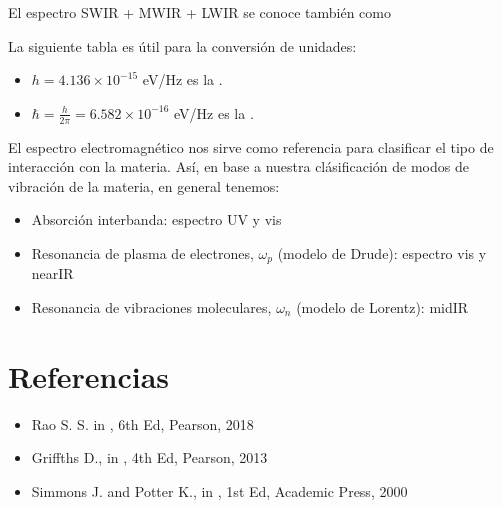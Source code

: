 \documentclass[letterpaper,10pt,english]{jupyterBook}
\let\sphinxpxdimen\pdfpxdimen\else\newdimen\sphinxpxdimen
\begin{document}
\sphinxAtStartPar
El espectro SWIR + MWIR + LWIR se conoce también como 

\sphinxAtStartPar
La siguiente tabla es útil para la conversión de unidades:

\noindent{\hspace*{\fill}\sphinxincludegraphics[width=600\sphinxpxdimen]{{conversion_table}.png}\hspace*{\fill}}
\begin{itemize}
\item {} 
\sphinxAtStartPar
\(h = 4.136\times 10^{−15}\) eV/Hz es la .

\item {} 
\sphinxAtStartPar
\(\hbar = \frac{h}{2\pi} = 6.582\times10^{−16}\) eV/Hz es la .

\end{itemize}

\sphinxAtStartPar
El espectro electromagnético nos sirve como referencia para clasificar el tipo de interacción con la materia. Así, en base a nuestra clásificación de modos de vibración de la materia, en general tenemos:
\begin{itemize}
\item {} 
\sphinxAtStartPar
Absorción interbanda: espectro UV y vis

\item {} 
\sphinxAtStartPar
Resonancia de plasma de electrones, \(\omega_p\) (modelo de Drude): espectro vis y near\sphinxhyphen{}IR

\item {} 
\sphinxAtStartPar
Resonancia de vibraciones moleculares, \(\omega_n\) (modelo de Lorentz): mid\sphinxhyphen{}IR

\end{itemize}


\section{Referencias}
\label{\detokenize{3_Interacci_xf3n_materia-luz/3_Interacci_xf3n_materia-luz:referencias}}\begin{itemize}
\item {} 
\sphinxAtStartPar
Rao S. S.  in , 6th Ed, Pearson, 2018

\item {} 
\sphinxAtStartPar
Griffths D.,  in , 4th Ed, Pearson, 2013

\item {} 
\sphinxAtStartPar
Simmons J. and Potter K.,  in , 1st Ed, Academic Press, 2000

\end{itemize}
\end{document}

